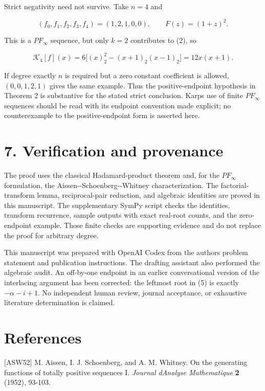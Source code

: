 \documentclass[11pt]{article}
\begin{document}
Strict negativity need not survive. Take \(n=4\) and

\[
(f_0,f_1,f_2,f_3,f_4)=(1,2,1,0,0),
\qquad F(z)=(1+z)^2.
\]

This is a \(PF_\infty\) sequence, but only \(k=2\) contributes to (2),
so

\[
\mathcal K_4[f](x)
=6\bigl[(x)_2^2-(x+1)_2(x-1)_2\bigr]
=12x(x+1).
\]

If degree exactly \(n\) is required but a zero constant coefficient is
allowed, \((0,0,1,2,1)\) gives the same example. Thus the
positive-endpoint hypothesis in Theorem 2 is substantive for the stated
strict conclusion. Karp\textquotesingle s use of finite \(PF_\infty\)
sequences should be read with its endpoint convention made explicit; no
counterexample to the positive-endpoint form is asserted here.

\section{7. Verification and
provenance}\label{verification-and-provenance}

The proof uses the classical Hadamard-product theorem and, for the
\(PF_\infty\) formulation, the Aissen-\/-Schoenberg-\/-Whitney
characterization. The factorial-transform lemma, reciprocal-pair
reduction, and algebraic identities are proved in this manuscript. The
supplementary SymPy script checks the identities, transform recurrence,
sample outputs with exact real-root counts, and the zero-endpoint
example. Those finite checks are supporting evidence and do not replace
the proof for arbitrary degree.

This manuscript was prepared with OpenAI Codex from the
author\textquotesingle s problem statement and publication instructions.
The drafting assistant also performed the algebraic audit. An off-by-one
endpoint in an earlier conversational version of the interlacing
argument has been corrected: the leftmost root in (5) is exactly
\(-\alpha-i+1\). No independent human review, journal acceptance, or
exhaustive literature determination is claimed.

\section{References}\label{references}

{[}ASW52{]} M. Aissen, I. J. Schoenberg, and A. M. Whitney. On the
generating functions of totally positive sequences I. \emph{Journal
d\textquotesingle Analyse Mathematique} \textbf{2} (1952), 93-103.
\end{document}
